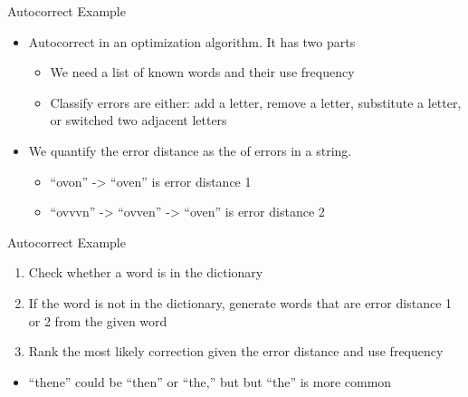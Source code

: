 \documentclass[
  ignorenonframetext,
]{beamer}
\providecommand{\tightlist}{%
  \setlength{\itemsep}{0pt}\setlength{\parskip}{0pt}}\usepackage{longtable,booktabs,array}
\begin{document}
\begin{frame}{Autocorrect Example}
\protect\hypertarget{autocorrect-example}{}
\begin{itemize}
\item
  Autocorrect in an optimization algorithm. It has two parts

  \begin{itemize}
  \item
    We need a list of known words and their use frequency
  \item
    Classify errors are either: add a letter, remove a letter,
    substitute a letter, or switched two adjacent letters
  \end{itemize}
\item
  We quantify the error distance as the of errors in a string.

  \begin{itemize}
  \item
    ``ovon'' -\textgreater{} ``oven'' is error distance 1
  \item
    ``ovvvn'' -\textgreater{} ``ovven'' -\textgreater{} ``oven'' is
    error distance 2
  \end{itemize}
\end{itemize}
\end{frame}

\begin{frame}{Autocorrect Example}
\protect\hypertarget{autocorrect-example-1}{}
\begin{enumerate}
\item
  Check whether a word is in the dictionary
\item
  If the word is not in the dictionary, generate words that are error
  distance 1 or 2 from the given word
\item
  Rank the most likely correction given the error distance and use
  frequency
\end{enumerate}

\begin{itemize}
\tightlist
\item
  ``thene'' could be ``then'' or ``the,'' but but ``the'' is more common
\end{itemize}
\end{frame}
\end{document}
